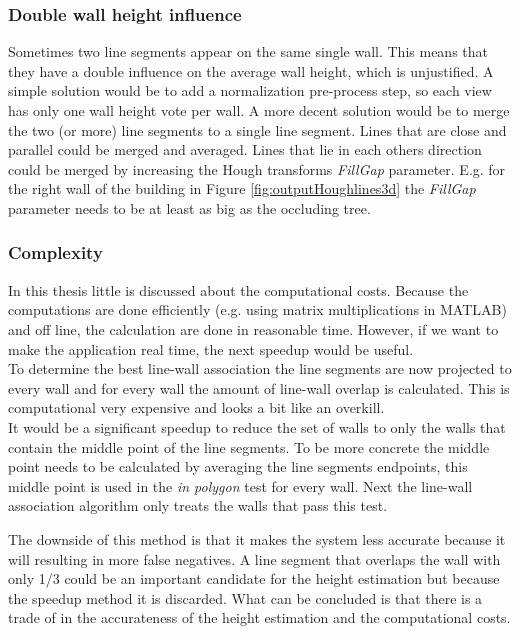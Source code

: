 \subsubsection{Double wall height influence}
Sometimes two line segments appear on the same single wall. This means that they have a double
influence on the average wall height, which is unjustified. 
A simple solution would be to add a normalization pre-process step, so each view
has only one wall height vote per wall. A more decent solution would be to
merge the two (or more) line segments to a single line segment. 
Lines that are close and parallel could be merged and averaged.
Lines that lie in each others direction could be merged by increasing the 
Hough transforms \emph{FillGap} parameter.  E.g. for the right wall of the building in 
Figure \ref{fig:outputHoughlines3d} the \emph{FillGap} parameter needs to be at
least as big as the occluding tree.

\subsubsection{Complexity}
In this thesis little is discussed about the computational costs. Because the 
computations are done efficiently (e.g. using matrix multiplications
in MATLAB\cite{matlab}) and off line, the calculation are done in reasonable time.
However, if we want to make the application real time, the next speedup would be useful.\\
To determine the best line-wall association the line segments are now projected to
every wall and for every wall the amount of line-wall overlap is calculated. This
is computational very expensive and looks a bit like an overkill.\\

It would be a significant speedup to reduce the set of walls to only the walls
that contain the middle point of the line segments. To be more concrete the
middle point needs to be calculated by averaging the line segments endpoints,
this middle point is used in the \emph{in polygon} test for every wall.  Next the
line-wall association algorithm only treats the walls that pass this test.

The downside of this method is that it makes the system less accurate because it
will resulting in more false negatives. A line segment that overlaps the wall with only 1/3 could be an
important candidate for the height estimation but because the speedup method it is discarded.
What can be concluded is that there is a trade of in the accurateness of the
height estimation and the computational costs.


